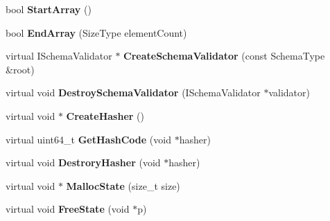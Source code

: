 \begin{DoxyCompactItemize}
\item 
bool {\bfseries Start\+Array} ()\hypertarget{class_generic_schema_validator_aba13751f802531ed8cbd850778ea993c}{}\label{class_generic_schema_validator_aba13751f802531ed8cbd850778ea993c}

\item 
bool {\bfseries End\+Array} (Size\+Type element\+Count)\hypertarget{class_generic_schema_validator_a67b501f0f65d40e0086ca8216882b34f}{}\label{class_generic_schema_validator_a67b501f0f65d40e0086ca8216882b34f}

\item 
virtual I\+Schema\+Validator $\ast$ {\bfseries Create\+Schema\+Validator} (const Schema\+Type \&root)\hypertarget{class_generic_schema_validator_af074f9c8f2cfc07e1b3d3f8862e7ef11}{}\label{class_generic_schema_validator_af074f9c8f2cfc07e1b3d3f8862e7ef11}

\item 
virtual void {\bfseries Destroy\+Schema\+Validator} (I\+Schema\+Validator $\ast$validator)\hypertarget{class_generic_schema_validator_ae24fa298e328f1fd7dda2ef6267156d2}{}\label{class_generic_schema_validator_ae24fa298e328f1fd7dda2ef6267156d2}

\item 
virtual void $\ast$ {\bfseries Create\+Hasher} ()\hypertarget{class_generic_schema_validator_abc377481583ca2095fb784be88887faa}{}\label{class_generic_schema_validator_abc377481583ca2095fb784be88887faa}

\item 
virtual uint64\+\_\+t {\bfseries Get\+Hash\+Code} (void $\ast$hasher)\hypertarget{class_generic_schema_validator_ac01c45982a1f512e1ca06fe5544b0c0f}{}\label{class_generic_schema_validator_ac01c45982a1f512e1ca06fe5544b0c0f}

\item 
virtual void {\bfseries Destrory\+Hasher} (void $\ast$hasher)\hypertarget{class_generic_schema_validator_a007eef58be575dc562543d069ddd2710}{}\label{class_generic_schema_validator_a007eef58be575dc562543d069ddd2710}

\item 
virtual void $\ast$ {\bfseries Malloc\+State} (size\+\_\+t size)\hypertarget{class_generic_schema_validator_a7c999dfb3118aaa08495d60eee6d3732}{}\label{class_generic_schema_validator_a7c999dfb3118aaa08495d60eee6d3732}

\item 
virtual void {\bfseries Free\+State} (void $\ast$p)\hypertarget{class_generic_schema_validator_a4e250737a411af2969a9e585a7da4187}{}\label{class_generic_schema_validator_a4e250737a411af2969a9e585a7da4187}

\end{DoxyCompactItemize}


